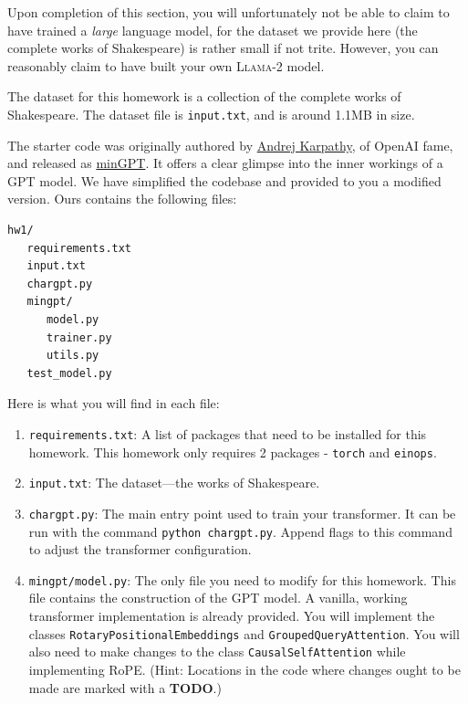 \documentclass[11pt,addpoints,answers]{exam}
\begin{document}
\begin{questions}
Upon completion of this section, you will unfortunately not be able to claim to have trained a \emph{large} language model, for the dataset we provide here (the complete works of Shakespeare) is rather small if not trite. However, you can reasonably claim to have built your own \textsc{Llama}-2 model.


 The dataset for this homework is a collection of the complete works of Shakespeare. The dataset file is \lstinline{input.txt}, and is around 1.1MB in size. 

 The starter code was originally authored by \href{https://karpathy.ai/}{Andrej Karpathy}, of OpenAI fame, and released as \href{https://github.com/karpathy/minGPT}{minGPT}. It offers a clear glimpse into the inner workings of a GPT model. We have simplified the codebase and provided to you a modified version. Ours contains the following files:
\begin{verbatim}
hw1/
   requirements.txt
   input.txt
   chargpt.py
   mingpt/
      model.py
      trainer.py
      utils.py
   test_model.py
\end{verbatim}
Here is what you will find in each file:
\begin{enumerate}
    
    \item \lstinline{requirements.txt}: A list of packages that need to be installed for this homework. This homework only requires 2 packages - \lstinline{torch} and \lstinline{einops}.
    
    \item \lstinline{input.txt}: The dataset---the works of Shakespeare.
    
    \item \lstinline{chargpt.py}: The main entry point used to train your transformer. It can be run with the command \lstinline{python chargpt.py}. Append flags to this command to adjust the transformer configuration.
    
    \item \lstinline{mingpt/model.py}: The only file you need to modify for this homework. This file contains the construction of the GPT model. A vanilla, working transformer implementation is already provided. You will implement the classes \lstinline{RotaryPositionalEmbeddings} and \lstinline{GroupedQueryAttention}. You will also need to make changes to the class \lstinline{CausalSelfAttention} while implementing RoPE. (Hint: Locations in the code where changes ought to be made are marked with a \textbf{TODO}.)


\end{enumerate}
\end{questions}
\end{document}
